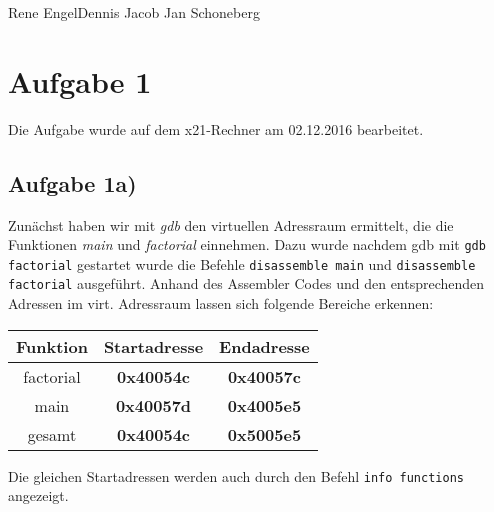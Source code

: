 \documentclass{ti2}
\begin{document}
%
                {Rene Engel}{Dennis Jacob}%
                {Jan Schoneberg}%
                


\section*{Aufgabe 1}
Die Aufgabe wurde auf dem x21-Rechner am  02.12.2016 bearbeitet. 
\subsection*{Aufgabe 1a)}
Zunächst haben wir mit \textit{gdb} den virtuellen Adressraum ermittelt, die die Funktionen \textit{main} und \textit{factorial} einnehmen. Dazu wurde nachdem gdb mit \texttt{gdb factorial} gestartet wurde die Befehle \texttt{disassemble main} und \texttt{disassemble factorial} ausgeführt. Anhand des Assembler Codes und den entsprechenden Adressen im virt. Adressraum lassen sich folgende Bereiche erkennen:\\
\begin{center}
\begin{tabular}{c|c|c}
Funktion & Startadresse & Endadresse \\
\hline 
factorial & \textbf{0x40054c} & \textbf{0x40057c} \\
main & \textbf{0x40057d} & \textbf{0x4005e5} \\
gesamt & \textbf{0x40054c} & \textbf{0x5005e5}\\
\end{tabular}
\end{center}
Die gleichen Startadressen werden auch durch den Befehl \texttt{info functions} angezeigt.
\end{document}
